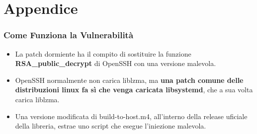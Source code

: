 \section{Appendice}

\begin{frame}
    \frametitle{Come Funziona la Vulnerabilità}
    \begin{itemize}
        \item La patch dormiente ha il compito di sostituire la funzione \textbf{RSA\_public\_decrypt} di OpenSSH con una versione malevola.
        \item OpenSSH normalmente non carica liblzma, ma \textbf{una patch comune delle distribuzioni linux fa sì che venga caricata libsystemd}, che a sua volta carica liblzma.
        \item Una versione modificata di build-to-host.m4, all'interno della release uficiale della libreria, estrae uno script che esegue l'iniezione malevola.
    \end{itemize}
\end{frame}